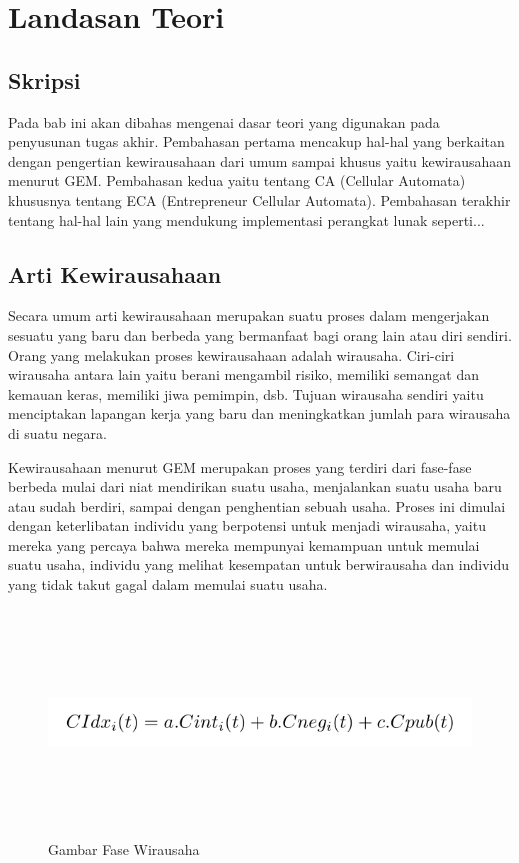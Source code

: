 \chapter{Landasan Teori}
\label{chap:teori}


\section{Skripsi}
\label{sec:skripsi} 
 
Pada bab ini akan dibahas mengenai dasar teori yang digunakan pada penyusunan tugas akhir. Pembahasan pertama mencakup hal-hal yang berkaitan dengan pengertian kewirausahaan dari umum sampai khusus yaitu kewirausahaan menurut GEM. Pembahasan kedua yaitu tentang CA (Cellular Automata) khususnya tentang ECA (Entrepreneur Cellular Automata). Pembahasan terakhir tentang hal-hal lain yang mendukung implementasi perangkat lunak seperti... 


\section{Arti Kewirausahaan}
\label{sec:artiwirausaha}

\graphicspath{{images/}}

Secara umum arti kewirausahaan merupakan suatu proses dalam mengerjakan sesuatu yang baru dan berbeda yang bermanfaat bagi orang lain atau diri sendiri. Orang yang melakukan proses kewirausahaan adalah wirausaha. Ciri-ciri wirausaha antara lain yaitu berani mengambil risiko, memiliki semangat dan kemauan keras, memiliki jiwa pemimpin, dsb. Tujuan wirausaha sendiri yaitu menciptakan lapangan kerja yang baru dan meningkatkan jumlah para wirausaha di suatu negara.


Kewirausahaan menurut GEM merupakan proses yang terdiri dari fase-fase berbeda mulai dari niat mendirikan suatu usaha, menjalankan suatu usaha baru atau sudah berdiri, sampai dengan penghentian sebuah usaha. Proses ini dimulai dengan keterlibatan individu yang berpotensi untuk menjadi wirausaha, yaitu mereka yang percaya bahwa mereka mempunyai kemampuan untuk memulai suatu usaha, individu yang melihat kesempatan untuk berwirausaha dan individu yang tidak takut gagal dalam memulai suatu usaha.
\begin{figure} 
	\centering  
	\includegraphics[width=14cm, height=6cm]{Capture}  
	\caption[Gambar Fase Wirausaha]{Gambar Fase Wirausaha} 
	\label{fig:artiwirausaha} 
\end{figure}



 

